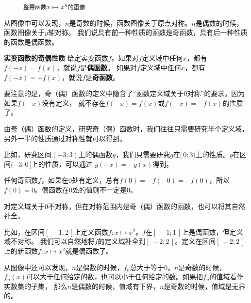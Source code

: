 \documentclass[12pt,UTF8,fontset=none]{ctexbook}
\begin{document}
\begin{figure}[h]
    \caption*{\texttt{整幂函数}$x\mapsto x^n$\texttt{的图像}}
\end{figure}

从图像中可以发现，$n$是奇数的时候，函数图像关于原点对称。$n$是偶数的时候，函数图像关于$y$轴对称。
我们说具有前一种性质的函数是奇函数，具有后一种性质的函数是偶函数。
\begin{df}\textbf{实变函数的奇偶性质}
    给定实变函数$f$。如果对$f$定义域中任何$x$，都有$f(-x) = f(x)$，就说$f$是\textbf{偶函数}。
如果对$f$定义域中任何$x$，都有$f(-x) = -f(x)$，就说$f$是\textbf{奇函数}。
\end{df}

要注意的是，奇（偶）函数的定义中隐含了“函数定义域关于$0$对称”的要求。因为如果$f(-x)$没有定义，
就不存在$f(-x) = f(x)$或$f(-x) = -f(x)$的性质了。

由奇（偶）函数的定义，研究奇（偶）函数时，我们往往只需要研究半个定义域，另外一半的性质通过对称性就可以得到。

比如，研究区间$(-3;3)$上的偶函数$g$，我们只需要研究$g$在$[\,0;3)$上的性质。$g$在区间$(-3;0\,]$上的性质，可以通过
$g(-x) = -g(x)$得到。

任何奇函数$f$，如果在$0$处有定义，总有$f(0) = - f(-0) = - f(0)$，所以$f(0) = 0$。偶函数在$0$处的值则不一定是$0$。

对定义域关于$0$不对称，但在对称范围内是奇（偶）函数的函数，也可以将其自然补全。

比如，在区间$[\,-1;2\,]$上定义函数$f: x\mapsto x^2$。$f$在$[\,-1;1\,]$上是偶函数，但定义域不对称。
我们可以自然地将$f$的定义域补全到$[\,-2;2\,]$。定义在区间$[\,-2;2\,]$上的新函数$f: x\mapsto x^2$就是偶函数了。

从图像中还可以发现，$n$是偶数的时候，$f_n$总大于等于$0$。$n$是奇数的时候，
$f_n(x)$可以大于任何给定的数，也可以小于任何给定的数。如果把$f_n$的值域看作实数集的子集，
那么$n$是偶数的时候，值域有下界，$n$是奇数的时候，值域是无界的。
\end{document}
